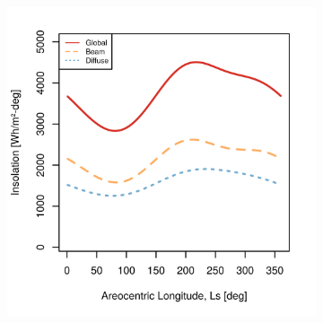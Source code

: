 \begin{figure}[h]
\captionsetup[subfigure]{justification=centering}
\vspace{-2ex}
	\centering
    \setlength{\subfigureWidth}{0.50\textwidth}
    \setlength{\graphicsHeight}{70mm}
    \hypersetup{hidelinks=true}%
  	\begin{subfigure}[t]{\subfigureWidth}
      \centering
  		\includegraphics[height=\graphicsHeight]{sections/mars-solar-energy/solar-radiation/plots/hh-hbh-and-hdh-as-a-function-of-ls-for-tau05-phi2-and-albedo-027}
  		\label{fig:sub:insolation-ls-tau-factor-0p5}
  	\end{subfigure}\hfill
    \begin{subfigure}[t]{\subfigureWidth}
      \centering

\end{subfigure}
\end{figure}
